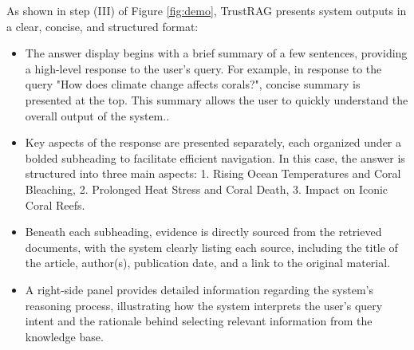 As shown in step (III) of Figure \ref{fig:demo}, TrustRAG presents system outputs in a clear, concise, and structured format:
\begin{itemize}
    \item The answer display begins with a brief summary of a few sentences, providing a high-level response to the user's query. For example, in response to the query "How does climate change affects corals?", concise summary is presented at the top. This summary allows the user to quickly understand the overall output of the system.. 
    \item Key aspects of the response are presented separately, each organized under a bolded subheading to facilitate efficient navigation. In this case, the answer is structured into three main aspects: 1. Rising Ocean Temperatures and Coral Bleaching, 2. Prolonged Heat Stress and Coral Death, 3. Impact on Iconic Coral Reefs.
    \item Beneath each subheading, evidence is directly sourced from the retrieved documents, with the system clearly listing each source, including the title of the article, author(s), publication date, and a link to the original material. 
    \item A right-side panel provides detailed information regarding the system's reasoning process, illustrating how the system interprets the user's query intent and the rationale behind selecting relevant information from the knowledge base.
\end{itemize}



